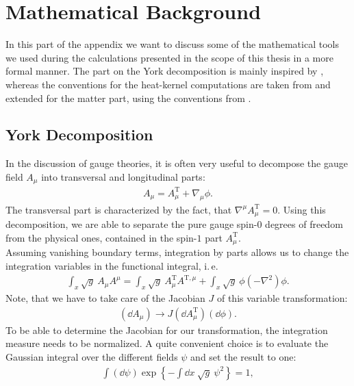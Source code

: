 \chapter{Mathematical Background}\label{chap:AppA}
In this part of the appendix we want to discuss some of the mathematical tools we used during the calculations presented in the scope of this thesis in a more formal manner. 
The part on the York decomposition is mainly inspired by \cite{Percacci2017}, whereas the conventions for the heat-kernel computations are taken from \cite{PawlowskiNPgaugeLecture} and extended for the matter part, using the conventions from \cite{CodelloPercacciRahmede2008}.

\section{York Decomposition}
In the discussion of gauge theories, it is often very useful to decompose the gauge field $A_{\mu}$ into transversal and longitudinal parts:
\begin{align}
	A_{\mu} = A_{\mu}^{\mathrm{T}} + \nabla_{\mu}\phi.
\end{align}
The transversal part is characterized by the fact, that $\nabla^{\mu}A_{\mu}^{\mathrm{T}} = 0$. Using this decomposition, we are able to separate the pure gauge spin-$0$ degrees of freedom from the physical ones, contained in the spin-$1$ part $A_{\mu}^{\mathrm{T}}$.\\
Assuming vanishing boundary terms, integration by parts allows us to change the integration variables in the functional integral, i.\,e.
\begin{align}
	\int_x \sqrt{g} \ A_{\mu}A^{\mu} = \int_x \sqrt{g} \ A_{\mu}^{\mathrm{T}}A^{\mathrm{T}, \mu} + \int_x \sqrt{g} \ \phi\left(-\nabla^2\right)\phi.
\end{align}
Note, that we have to take care of the Jacobian $J$ of this variable transformation:
\begin{align}
	\left(\dd A_{\mu}\right) \longrightarrow J\left(\dd A_{\mu}^{\mathrm{T}}\right)\left(\dd\phi\right).
\end{align}
To be able to determine the Jacobian for our transformation, the integration measure needs to be normalized. A quite convenient choice is to evaluate the Gaussian integral over the different fields $\psi$ and set the result to one:
\begin{align}\label{eqn:york_measure}
	\int\left(\dd\psi\right) \exp\left\{-\int\dd x \ \sqrt{g} \ \psi^2 \right\} = 1,
\end{align} 
